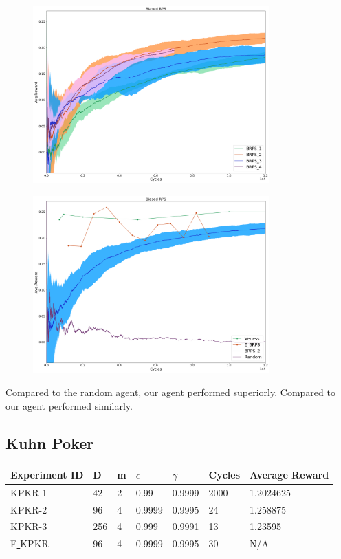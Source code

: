 \documentclass{article}
\theoremstyle{definition}
\newtheorem{primary statistics}[definition]{Primary Statistics}
\newtheorem{auxiliary statistics}[definition]{Auxiliary Statistics}
\begin{document}
 \begin{figure}[h]
 \centering
    \includegraphics[width=9.1cm]{4_Biased_RPS}
\end{figure}

\begin{figure}[h]
\centering
    \includegraphics[width=9.1cm]{Biased_RPS}
\end{figure}

Compared to the random agent, our agent performed superiorly. Compared to \citep{veness2011monte} our agent performed similarly.

\newpage

\subsection{Kuhn Poker}

\begin{tabular}{|l|l|l|l|l|l|l|}
\hline \centering 
  Experiment ID& D & m & $\epsilon$ & $\gamma$ & Cycles & Average Reward \\ \hline
KPKR-1  & 42        & 2           & 0.99        & 0.9999            & 2000   & 1.2024625        \\ \hline
KPKR-2  & 96        & 4           & 0.9999      & 0.9995            & 24     & 1.258875         \\ \hline
KPKR-3  & 256       & 4           & 0.999       & 0.9991            & 13     & 1.23595         \\ \hline
E\underline{ }KPKR  & 96       & 4           & 0.9999       & 0.9995            & 30     & N/A         \\ \hline
\end{tabular} 
\end{document}
